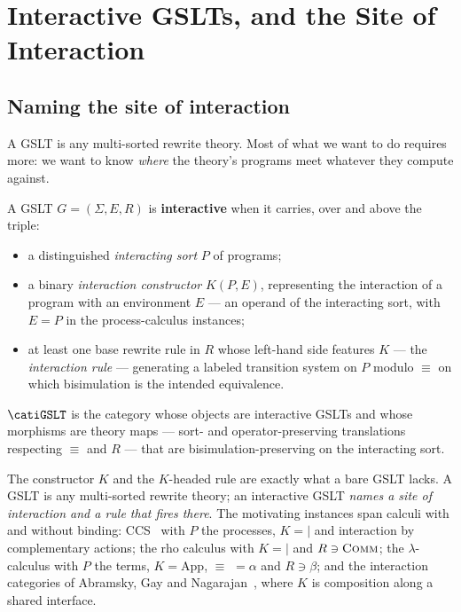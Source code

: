 \chapter{Interactive GSLTs, and the Site of Interaction}
\label{ch:igslt}

\section{Naming the site of interaction}

A GSLT is any multi-sorted rewrite theory. Most of what we want to do requires more:
we want to know \emph{where} the theory's programs meet whatever they compute against.

\begin{definition}
\label{ob:def:igslt}
A GSLT $G = (\Sigma,E,R)$ is \textbf{interactive} when it carries, over and above the
triple:
\begin{itemize}[leftmargin=2em]
  \item a distinguished \emph{interacting sort} $P$ of programs;
  \item a binary \emph{interaction constructor} $K(P,E)$, representing the interaction
    of a program with an environment $E$ --- an operand of the interacting sort, with
    $E = P$ in the process-calculus instances;
  \item at least one base rewrite rule in $R$ whose left-hand side features $K$ --- the
    \emph{interaction rule} --- generating a labeled transition system on $P$ modulo
    $\equiv$ on which bisimulation is the intended equivalence.
\end{itemize}
\end{definition}

\begin{definition}
$\catiGSLT$ is the category whose objects are interactive GSLTs and whose morphisms are
theory maps --- sort- and operator-preserving translations respecting $\equiv$ and $R$
--- that are bisimulation-preserving on the interacting sort.
\end{definition}

The constructor $K$ and the $K$-headed rule are exactly what a bare GSLT lacks. A GSLT
is any multi-sorted rewrite theory; an interactive GSLT \emph{names a site of
interaction and a rule that fires there}. The motivating instances span calculi with and
without binding: CCS~\cite{milnerCC} with $P$ the processes, $K = {\mid}$ and
interaction by complementary actions; the rho calculus with $K = {\mid}$ and $R \ni
\textsc{Comm}$; the $\lambda$-calculus with $P$ the terms, $K = \mathrm{App}$, $\equiv$
$= \alpha$ and $R \ni \beta$; and the interaction categories of Abramsky, Gay and
Nagarajan~\cite{AbramskyGayNagarajan1996}, where $K$ is composition along a shared
interface.

